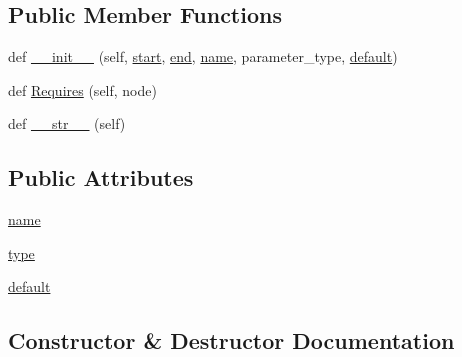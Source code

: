 \subsection*{Public Member Functions}
\begin{DoxyCompactItemize}
\item 
def \hyperlink{classcpp_1_1ast_1_1_parameter_a4fe27f559d44adac9e9b5898ba76c5b3}{\+\_\+\+\_\+init\+\_\+\+\_\+} (self, \hyperlink{classcpp_1_1ast_1_1_node_a7b2aa97e6a049bb1a93aea48c48f1f44}{start}, \hyperlink{classcpp_1_1ast_1_1_node_a3c5e5246ccf619df28eca02e29d69647}{end}, \hyperlink{classcpp_1_1ast_1_1_parameter_aae0375fb0ded8fa9090feea6bdff2784}{name}, parameter\+\_\+type, \hyperlink{classcpp_1_1ast_1_1_parameter_a4ceae2ac87d82c5542c4e7385eb4c97e}{default})
\item 
def \hyperlink{classcpp_1_1ast_1_1_parameter_a4bc5c17a0d606d35be40cb4c2c1a67a6}{Requires} (self, node)
\item 
def \hyperlink{classcpp_1_1ast_1_1_parameter_aabfbabb3c744a0da4a012ceb4299947a}{\+\_\+\+\_\+str\+\_\+\+\_\+} (self)
\end{DoxyCompactItemize}
\subsection*{Public Attributes}
\begin{DoxyCompactItemize}
\item 
\hyperlink{classcpp_1_1ast_1_1_parameter_aae0375fb0ded8fa9090feea6bdff2784}{name}
\item 
\hyperlink{classcpp_1_1ast_1_1_parameter_a5eed090000c41551a10c21f175ad33e3}{type}
\item 
\hyperlink{classcpp_1_1ast_1_1_parameter_a4ceae2ac87d82c5542c4e7385eb4c97e}{default}
\end{DoxyCompactItemize}


\subsection{Constructor \& Destructor Documentation}
\mbox{\label{classcpp_1_1ast_1_1_parameter_a4fe27f559d44adac9e9b5898ba76c5b3}} 

